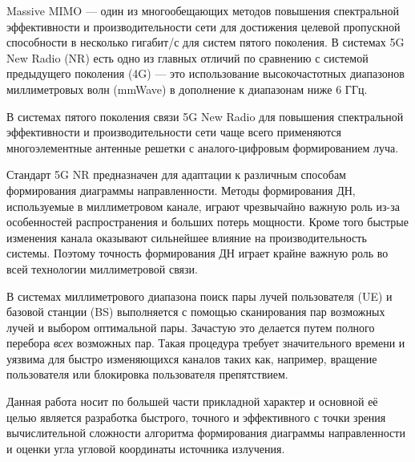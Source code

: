 \Introduction

Massive MIMO — один из многообещающих методов повышения спектральной
эффективности и производительности сети для достижения целевой пропускной
способности в несколько гигабит/с для систем пятого поколения.  В системах 5G
New Radio (NR) есть одно из главных отличий по сравнению с системой предыдущего
поколения (4G) — это использование высокочастотных диапазонов миллиметровых волн
(mmWave) в дополнение к диапазонам ниже 6 ГГц. 

В системах пятого поколения связи 5G New Radio для повышения спектральной
эффективности и производительности  сети чаще всего применяются многоэлементные 
антенные решетки с аналого-цифровым формированием луча.   

Стандарт 5G NR предназначен для адаптации к различным способам
формирования диаграммы направленности. Методы формирования ДН,
используемые в миллиметровом канале, играют чрезвычайно
важную роль из-за особенностей распространения и больших потерь мощности.
Кроме того быстрые изменения канала оказывают сильнейшее влияние на
производительность системы.  Поэтому точность формирования ДН
играет крайне важную роль во всей технологии миллиметровой связи. 

В системах миллиметрового диапазона поиск пары лучей пользователя (UE)
и базовой станции (BS) выполняется с помощью сканирования пар
возможных лучей и выбором оптимальной пары. Зачастую это делается путем полного
перебора \textit{всех} возможных пар.  Такая процедура требует значительного
времени и уязвима для быстро изменяющихся каналов таких как, например,
вращение пользователя или блокировка пользователя препятствием. 


Данная работа носит по большей части прикладной характер и основной её целью
является разработка  быстрого, точного и эффективного с
точки зрения вычислительной сложности алгоритма формирования диаграммы
направленности и оценки угла угловой координаты источника излучения. 




